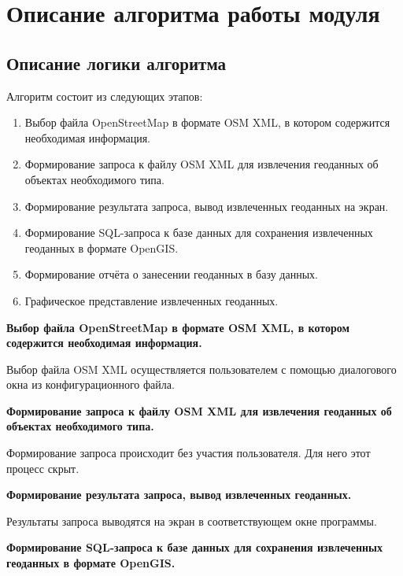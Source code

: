 \documentclass[12pt,a4paper,oneside]{article} %
\begin{document}
\newpage
\section{Описание алгоритма работы модуля}
\subsection{Описание логики алгоритма}
Алгоритм состоит из следующих этапов:
\begin{enumerate}
\item Выбор файла OpenStreetMap в формате OSM XML, в котором \linebreak
содержится необходимая информация.
\item Формирование запроса к файлу OSM XML для извлечения геоданных \linebreak
об объектах необходимого типа.
\item Формирование результата запроса, вывод извлеченных геоданных на экран.
\item Формирование SQL-запроса к базе данных для сохранения извлеченных \linebreak
геоданных в формате OpenGIS.
\item Формирование отчёта о занесении геоданных в базу данных.
\item Графическое представление извлеченных геоданных.
\end{enumerate}

\textbf{Выбор файла OpenStreetMap в формате OSM XML, в котором \linebreak
содержится необходимая информация.}

Выбор файла OSM XML осуществляется пользователем с помощью \linebreak
диалогового окна из конфигурационного файла.

\textbf{Формирование запроса к файлу OSM XML для извлечения \linebreak
геоданных об объектах необходимого типа.}

Формирование запроса происходит без участия пользователя. \linebreak
Для него этот процесс скрыт.

\textbf{Формирование результата запроса, вывод извлеченных \linebreak
геоданных.}

Результаты запроса выводятся на экран в соответствующем окне программы.

\textbf{Формирование SQL-запроса к базе данных для сохранения \linebreak
извлеченных геоданных в формате OpenGIS.}
\end{document}
